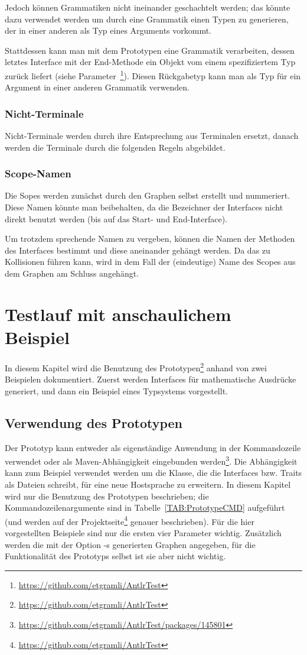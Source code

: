 \documentclass[../InterneDSLs.tex]{subfiles}
\begin{document}
Jedoch können Grammatiken nicht ineinander geschachtelt werden; das könnte dazu verwendet werden um durch eine Grammatik einen Typen zu generieren, der in einer anderen als Typ eines Arguments vorkommt.

Stattdessen kann man mit dem Prototypen eine Grammatik verarbeiten, dessen letztes Interface mit der End-Methode ein Objekt vom einem spezifiziertem Typ zurück liefert (siehe Parameter~\footnote{\url{https://github.com/etgramli/AntlrTest}}). Diesen Rückgabetyp kann man als Typ für ein Argument in einer anderen Grammatik verwenden.

\subsection{Nicht-Terminale}
Nicht-Terminale werden durch ihre Entsprechung aus Terminalen ersetzt, danach werden die Terminale durch die folgenden Regeln abgebildet.

\subsection{Scope-Namen}
Die Sopes werden zunächst durch den Graphen selbst erstellt und nummeriert. Diese Namen könnte man beibehalten, da die Bezeichner der Interfaces nicht direkt benutzt werden (bis auf das Start- und End-Interface).

Um trotzdem sprechende Namen zu vergeben, können die Namen der Methoden des Interfaces bestimmt und diese aneinander gehängt werden. Da das zu Kollisionen führen kann, wird in dem Fall der (eindeutige) Name des Scopes aus dem Graphen am Schluss angehängt.


\chapter{Testlauf mit anschaulichem Beispiel}\label{SEC:Example}
In diesem Kapitel wird die Benutzung des Prototypen\footnote{\url{https://github.com/etgramli/AntlrTest}} anhand von zwei Beispielen dokumentiert. Zuerst werden Interfaces für mathematische Ausdrücke generiert, und dann ein Beispiel eines Typsystems vorgestellt.

\section{Verwendung des Prototypen}
Der Prototyp kann entweder als eigenständige Anwendung in der Kommandozeile verwendet oder als Maven-Abhängigkeit eingebunden werden\footnote{\url{https://github.com/etgramli/AntlrTest/packages/145801}}. Die Abhängigkeit kann zum Beispiel verwendet werden um die Klasse, die die Interfaces bzw. Traits als Dateien schreibt, für eine neue Hostsprache zu erweitern. In diesem Kapitel wird nur die Benutzung des Prototypen beschrieben; die Kommandozeilenargumente sind in Tabelle~\ref{TAB:PrototypeCMD} aufgeführt (und werden auf der Projektseite\footnote{\url{https://github.com/etgramli/AntlrTest}} genauer beschrieben). Für die hier vorgestellten Beispiele sind nur die ersten vier Parameter wichtig. Zusätzlich werden die mit der Option -s generierten Graphen angegeben, für die Funktionalität des Prototyps selbst ist sie aber nicht wichtig.
\end{document}
